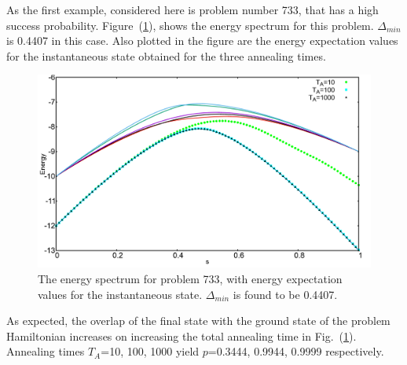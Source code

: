 \documentclass[../main.tex]{subfiles}
\begin{document}
As the first example, considered here is problem number 733, that has a high success probability. Figure~(\ref{fig:o2}), shows the energy spectrum for this problem. $\Delta_{min}$ is 0.4407 in this case. Also plotted in the figure are the energy expectation values for the instantaneous state obtained for the three annealing times.
\begin{figure}[H]
\centering 
\includegraphics[scale=0.24]{733_s12_O.png}
\caption{The energy spectrum for problem 733, with energy expectation values for the instantaneous state. $\Delta_{min}$ is found to be 0.4407.}
\label{fig:o2}
\end{figure}

As expected, the overlap of the final state with the ground state of the problem Hamiltonian increases on increasing the total annealing time in Fig.~(\ref{fig:o2}). Annealing times $T_A$=10, 100, 1000 yield $p$=0.3444, 0.9944, 0.9999 respectively.\\
\end{document}
